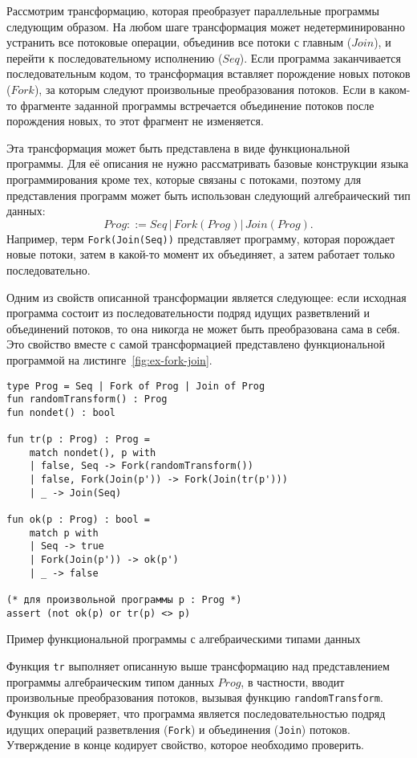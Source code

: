 \begin{example}[$ForkJoin$]\label{ex:fork-join-chcs}
Рассмотрим трансформацию, которая преобразует параллельные программы следующим образом. 
На любом шаге трансформация может недетерминированно устранить все потоковые операции, объединив все потоки с главным ($Join$), и перейти к последовательному исполнению ($Seq$).
Если программа заканчивается последовательным кодом, то трансформация вставляет порождение новых потоков ($Fork$), за которым следуют произвольные преобразования потоков.
Если в каком-то фрагменте заданной программы встречается объединение потоков после порождения новых, то этот фрагмент не изменяется.

Эта трансформация может быть представлена в виде функциональной программы. Для её описания не нужно рассматривать базовые конструкции языка программирования кроме тех, которые связаны с потоками, поэтому для представления программ может быть использован следующий алгебраический тип данных:
$$ Prog ::= Seq\,|\,Fork(Prog)|\,Join(Prog). $$
Например, терм \texttt{Fork(Join(Seq))} представляет программу, которая порождает новые потоки, затем в какой-то момент их объединяет, а затем работает только последовательно.

Одним из свойств описанной трансформации является следующее: если исходная программа состоит из последовательности подряд идущих разветвлений и объединений потоков, то она никогда не может быть преобразована сама в себя.
Это свойство вместе с самой трансформацией представлено функциональной программой на листинге~\ref{fig:ex-fork-join}.
\begin{mylisting}
\begin{verbatim}
type Prog = Seq | Fork of Prog | Join of Prog
fun randomTransform() : Prog
fun nondet() : bool

fun tr(p : Prog) : Prog =
    match nondet(), p with
    | false, Seq -> Fork(randomTransform())
    | false, Fork(Join(p')) -> Fork(Join(tr(p')))
    | _ -> Join(Seq)

fun ok(p : Prog) : bool =
    match p with
    | Seq -> true
    | Fork(Join(p')) -> ok(p')
    | _ -> false

(* для произвольной программы p : Prog *)
assert (not ok(p) or tr(p) <> p)
\end{verbatim}
\caption{Пример функциональной программы с алгебраическими типами данных}
\label{fig:ex-fork-join}
\end{mylisting}

Функция \texttt{tr} выполняет описанную выше трансформацию над представлением программы алгебраическим типом данных $Prog$, в частности, вводит произвольные преобразования потоков, вызывая функцию \texttt{randomTransform}. Функция \texttt{ok} проверяет, что программа является последовательностью подряд идущих операций разветвления (\texttt{Fork}) и объединения (\texttt{Join}) потоков. Утверждение в конце кодирует свойство, которое необходимо проверить.


\end{example}
